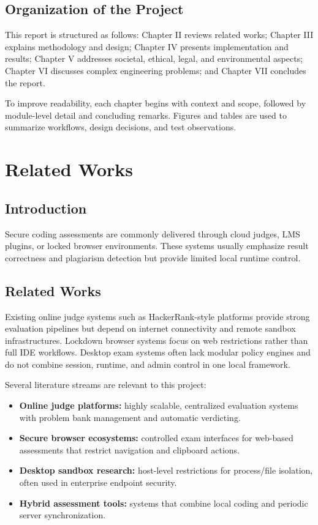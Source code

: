 \documentclass[12pt,a4paper]{report}
\begin{document}
	\section{Organization of the Project}
	This report is structured as follows: Chapter II reviews related works; Chapter III explains methodology and design; Chapter IV presents implementation and results; Chapter V addresses societal, ethical, legal, and environmental aspects; Chapter VI discusses complex engineering problems; and Chapter VII concludes the report.
	
	To improve readability, each chapter begins with context and scope, followed by module-level detail and concluding remarks. Figures and tables are used to summarize workflows, design decisions, and test observations.
	
	\chapter{Related Works}
	
	\section{Introduction}
	Secure coding assessments are commonly delivered through cloud judges, LMS plugins, or locked browser environments. These systems usually emphasize result correctness and plagiarism detection but provide limited local runtime control.
	
	\section{Related Works}
	Existing online judge systems such as HackerRank-style platforms provide strong evaluation pipelines but depend on internet connectivity and remote sandbox infrastructures. Lockdown browser systems focus on web restrictions rather than full IDE workflows. Desktop exam systems often lack modular policy engines and do not combine session, runtime, and admin control in one local framework.
	
	Several literature streams are relevant to this project:
	\begin{itemize}
		\item \textbf{Online judge platforms:} highly scalable, centralized evaluation systems with problem bank management and automatic verdicting.
		\item \textbf{Secure browser ecosystems:} controlled exam interfaces for web-based assessments that restrict navigation and clipboard actions.
		\item \textbf{Desktop sandbox research:} host-level restrictions for process/file isolation, often used in enterprise endpoint security.
		\item \textbf{Hybrid assessment tools:} systems that combine local coding and periodic server synchronization.
	\end{itemize}
	
\end{document}
